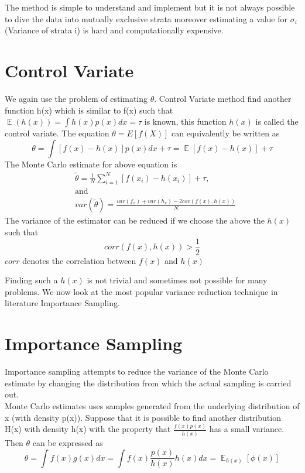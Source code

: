 \documentclass[a4paper,twoside]{iiththesis}
\theoremstyle{definition}
\theoremstyle{definition}
\theoremstyle{remark}
\DeclareMathOperator*{\E}{\mathop{\mathbb{E}}}
\begin{document}
The method is simple to understand and implement but it is not always possible to dive the data into mutually exclusive strata moreover estimating a value for $\sigma_i$(Variance of strata i) is hard and computationally expensive. 

\section{Control Variate}

We again use the problem of estimating $\theta$. Control Variate method find another function h(x) which is similar to f(x) such that $\E(h(x)) = \int h(x) p(x) dx = \tau $ is known, this function $h(x)$ is called the control variate. The equation $\theta = E[f(X)]$ can equivalently be written as  
\begin{equation}
	\theta = \int [f(x) - h(x)] p(x) dx + \tau = \E[f(x) - h(x)] + \tau
\end{equation}
The Monte Carlo estimate for above equation is 
\begin{align}
&\widetilde{\theta} = \frac{1}{N} \sum_{i=1}^N [f(x_i) - h(x_i)] + \tau,  \\
& \text{and} \\
& var(\tilde{\theta}) = \frac{var(f_x) + var(h_x) - 2 cov(f(x), h(x))}{N}
\end{align}
The variance of the estimator can be reduced if we choose the above the $h(x)$ such that 
\begin{equation}
corr(f(x), h(x)) > \frac{1}{2}
\end{equation}
$corr$ denotes the correlation between $f(x)$ and $h(x)$ 

Finding such a $h(x)$ is not trivial and sometimes not possible for many problems. We now look at the most popular variance reduction technique in literature Importance Sampling. 

\section{Importance Sampling }
Importance sampling attempts to reduce the variance of the Monte Carlo estimate by changing the distribution from which the actual sampling is carried out.\\ Monte Carlo estimates uses samples generated from the underlying distribution of x (with density p(x)). Suppose that it is possible to find another distribution H(x) with density h(x) with the property that $\frac{f(x)p(x)}{h(x)}$ has a small variance. Then $\theta$ can be expressed as
\begin{equation}\label{Imporatnce Sampling}
\theta =\int f(x)g(x)dx =\int  f(x) \frac{p(x)} {h(x)} h(x)dx = \E_{h(x)} [\phi(x)]
\end{equation}
\end{document}
